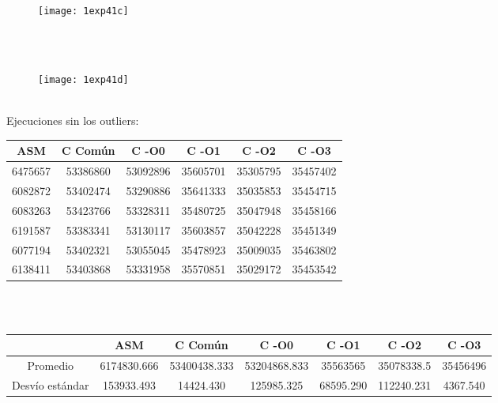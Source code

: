 ﻿\documentclass[a4paper]{article}
\begin{document}
\ \\
\ \\
\begin{figure}[H]
  \centering
    \texttt{[image: 1exp41c]}
\end{figure}
\ \\
\ \\
\begin{figure}[H]
  \centering
    \texttt{[image: 1exp41d]}
\end{figure}
\ \\
Ejecuciones sin los outliers:
\ \\
\begin{center}
  \begin{tabular}{| c | c | c | c | c | c |}
    \hline
    ASM & C Com\'un &C -O0 & C -O1 & C -O2 & C -O3\\ 
    \hline\hline

6475657 &53386860  &53092896  &35605701 & 35305795 & 35457402\\
\hline
6082872 &53402474 & 53290886  &35641333 & 35035853 & 35454715\\
\hline
6083263 &53423766 & 53328311 & 35480725 & 35047948 & 35458166\\
\hline
6191587& 53383341  &53130117  &35603857 & 35042228 & 35451349\\
\hline
6077194 &53402321 & 53055045 & 35478923 & 35009035 & 35463802\\
\hline
6138411 &53403868 & 53331958 & 35570851 & 35029172 & 35453542\\

  \hline
  \end{tabular}
\end{center}
\ \\
\ \\
\begin{center}
  \begin{tabular}{| c | c | c | c | c | c | c |}
    \hline
      & ASM & C Com\'un& C -O0 & C -O1 & C -O2 & C -O3 \\
      \hline\hline
      Promedio  & 6174830.666&  53400438.333 & 53204868.833 & 35563565 & 35078338.5 & 35456496\\
      \hline
      Desvío estándar & 153933.493 &14424.430  &125985.325 & 68595.290 & 112240.231 & 4367.540\\
      \hline
  \end{tabular}
\end{center}
\ \\
\ \\
\end{document}
